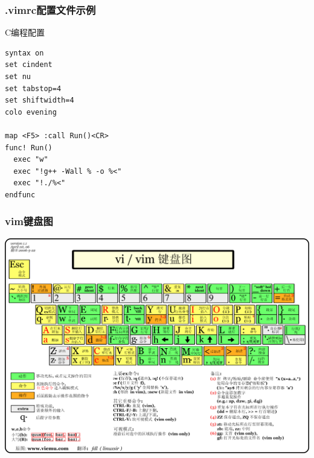 \documentclass[xcolor=svgnames,presentation]{beamer}
\begin{document}
\begin{frame}[fragile]
\frametitle{.vimrc配置文件示例}
\label{sec-4-6-13}
\begin{exampleblock}{C编程配置}
\label{sec-4-6-13-1}


\begin{verbatim}
syntax on
set cindent
set nu
set tabstop=4
set shiftwidth=4
colo evening

map <F5> :call Run()<CR>
func! Run()
  exec "w"
  exec "!g++ -Wall % -o %<"
  exec "!./%<"
endfunc
\end{verbatim}
\end{exampleblock}
\end{frame}
\begin{frame}
\frametitle{vim键盘图}
\label{sec-4-6-14}

\begin{center}
\includegraphics[width=.9\linewidth]{img/vim-keys.png}
\end{center}
\end{frame}
\end{document}
